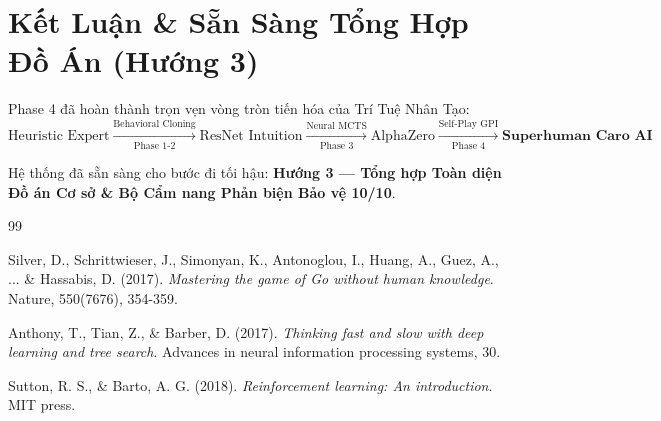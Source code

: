 \documentclass[12pt,a4paper,oneside]{report}
\begin{document}
\section{Kết Luận \& Sẵn Sàng Tổng Hợp Đồ Án (Hướng 3)}

Phase 4 đã hoàn thành trọn vẹn vòng tròn tiến hóa của Trí Tuệ Nhân Tạo:
\begin{equation}
    \text{Heuristic Expert} \xrightarrow[\text{Phase 1-2}]{\text{Behavioral Cloning}} \text{ResNet Intuition} \xrightarrow[\text{Phase 3}]{\text{Neural MCTS}} \text{AlphaZero} \xrightarrow[\text{Phase 4}]{\text{Self-Play GPI}} \mathbf{\text{Superhuman Caro AI}}
\end{equation}

Hệ thống đã sẵn sàng cho bước đi tối hậu: \textbf{Hướng 3 — Tổng hợp Toàn diện Đồ án Cơ sở \& Bộ Cẩm nang Phản biện Bảo vệ 10/10}.

\begin{thebibliography}{99}

Silver, D., Schrittwieser, J., Simonyan, K., Antonoglou, I., Huang, A., Guez, A., ... \& Hassabis, D. (2017).
\textit{Mastering the game of Go without human knowledge}.
Nature, 550(7676), 354-359.

Anthony, T., Tian, Z., \& Barber, D. (2017).
\textit{Thinking fast and slow with deep learning and tree search}.
Advances in neural information processing systems, 30.

Sutton, R. S., \& Barto, A. G. (2018).
\textit{Reinforcement learning: An introduction}.
MIT press.

\end{thebibliography}
\end{document}
